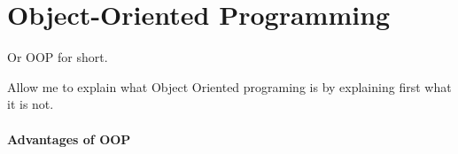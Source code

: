 \documentclass[a4paper, 9pt]{extarticle}
\begin{document}
\section{Object-Oriented Programming}

Or OOP for short.

Allow me to explain what Object Oriented programing is by explaining first what
it is not.

\begin{multicols}{2}
  \columnbreak
\end{multicols}

\paragraph{Advantages of OOP}
\end{document}
